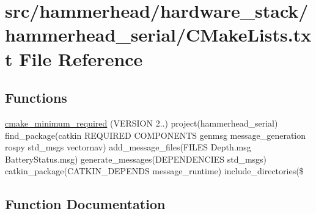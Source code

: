 \hypertarget{hardware__stack_2hammerhead__serial_2CMakeLists_8txt}{}\section{src/hammerhead/hardware\+\_\+stack/hammerhead\+\_\+serial/\+C\+Make\+Lists.txt File Reference}
\label{hardware__stack_2hammerhead__serial_2CMakeLists_8txt}
\subsection*{Functions}
\begin{DoxyCompactItemize}
\item 
\hyperlink{hardware__stack_2hammerhead__serial_2CMakeLists_8txt_a6f2b5df87c106c2560ca9a4e8fc1a9cd}{cmake\+\_\+minimum\+\_\+required} (V\+E\+R\+S\+I\+ON 2..) project(hammerhead\+\_\+serial) find\+\_\+package(catkin R\+E\+Q\+U\+I\+R\+ED C\+O\+M\+P\+O\+N\+E\+N\+TS genmsg message\+\_\+generation rospy std\+\_\+msgs vectornav) add\+\_\+message\+\_\+files(F\+I\+L\+ES Depth.\+msg Battery\+Status.\+msg) generate\+\_\+messages(D\+E\+P\+E\+N\+D\+E\+N\+C\+I\+ES std\+\_\+msgs) catkin\+\_\+package(C\+A\+T\+K\+I\+N\+\_\+\+D\+E\+P\+E\+N\+DS message\+\_\+runtime) include\+\_\+directories(\$
\end{DoxyCompactItemize}


\subsection{Function Documentation}

